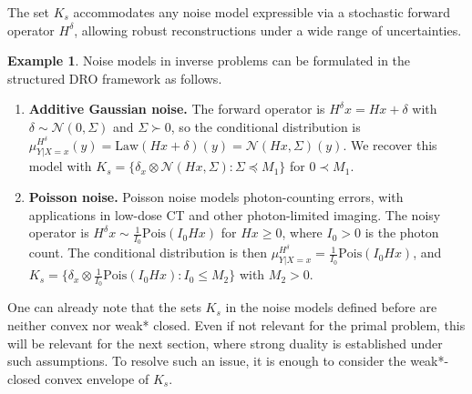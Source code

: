 \documentclass{article}
\theoremstyle{definition}
\theoremstyle{remarksty}
\newtheorem{example}{Example}[section]
\begin{document}
The set $K_s$ accommodates any noise model expressible via a stochastic forward operator $H^\delta$, allowing robust reconstructions under a wide range of uncertainties.
\begin{example}\label{ex:noise}
Noise models in inverse problems can be formulated in the structured DRO framework as follows.
\begin{enumerate}[label=\textnormal{(\alph*)}, itemsep=0pt, topsep=2pt]
    \item \textbf{Additive Gaussian noise.}\label{ex:noise:gaussian}
    The forward operator is $H^\delta x = Hx + \delta$ with $\delta \sim \mathcal{N}(0,\Sigma)$ and $\Sigma \succ 0$, so the conditional distribution is $\mu_{Y|X=x}^{H^\delta}(y) = \mathrm{Law}(Hx+\delta)(y) = \mathcal{N}(Hx,\Sigma)(y)$. We recover this model with $K_s = \{ \delta_x \otimes \mathcal{N}(Hx, \Sigma) : \Sigma \preceq M_1 \}$ for $0 \prec M_1$.

    \item \textbf{Poisson noise.}\label{ex:noise:poisson}
    Poisson noise models photon-counting errors, with applications in low-dose CT and other photon-limited imaging. The noisy operator is $H^\delta x \sim \tfrac{1}{I_0}\mathrm{Pois}(I_0 Hx)$ for $Hx \geq 0$, where $I_0 > 0$ is the photon count. The conditional distribution is then $\mu_{Y|X=x}^{H^\delta} = \tfrac{1}{I_0}\mathrm{Pois}(I_0 Hx)$, and $K_s = \{ \delta_x \otimes \tfrac{1}{I_0}\mathrm{Pois}(I_0 Hx) : I_0 \leq M_2 \}$ with $M_2>0$.
\end{enumerate}
One can already note that the sets $K_s$ in the noise models defined before are neither convex nor weak* closed. Even if not relevant for the primal problem, this will be relevant for the next section, where strong duality is established under such assumptions. To resolve such an issue, it is enough to consider the weak*-closed convex envelope of $K_s$.
\end{example}
\end{document}
